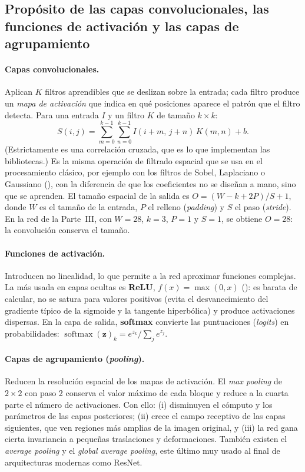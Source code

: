 \documentclass[11pt,letterpaper]{article}
\makeatletter
\newcommand{\cit@chk}[1]{\ifcsdef{citA@#1}{}{\PackageError{citas}{Cita no definida: #1}{}}}
\newcommand{\cit@item}[1]{\cit@chk{#1}\cit@sep\csuse{citA@#1}, \csuse{citY@#1}\gdef\cit@sep{; }}
\newcommand{\parencite}[1]{(\gdef\cit@sep{}\forcsvlist{\cit@item}{#1})}
\makeatother
\begin{document}
\subsection{Propósito de las capas convolucionales, las funciones de activación y las capas de agrupamiento}

\paragraph{Capas convolucionales.} Aplican $K$ filtros aprendibles que se deslizan sobre la entrada; cada filtro produce un \emph{mapa de activación} que indica en qué posiciones aparece el patrón que el filtro detecta. Para una entrada $I$ y un filtro $K$ de tamaño $k\times k$:
\begin{equation}
  S(i,j) = \sum_{m=0}^{k-1}\sum_{n=0}^{k-1} I(i+m,\,j+n)\,K(m,n) + b .
\end{equation}
(Estrictamente es una correlación cruzada, que es lo que implementan las bibliotecas.) Es la misma operación de filtrado espacial que se usa en el procesamiento clásico, por ejemplo con los filtros de Sobel, Laplaciano o Gaussiano \parencite{gonzalez2018}, con la diferencia de que los coeficientes no se diseñan a mano, sino que se aprenden. El tamaño espacial de la salida es $O = (W - k + 2P)/S + 1$, donde $W$ es el tamaño de la entrada, $P$ el relleno (\emph{padding}) y $S$ el paso (\emph{stride}). En la red de la Parte~III, con $W=28$, $k=3$, $P=1$ y $S=1$, se obtiene $O=28$: la convolución conserva el tamaño.

\paragraph{Funciones de activación.} Introducen no linealidad, lo que permite a la red aproximar funciones complejas. La más usada en capas ocultas es \textbf{ReLU}, $f(x)=\max(0,x)$ \parencite{nair2010}: es barata de calcular, no se satura para valores positivos (evita el desvanecimiento del gradiente típico de la sigmoide y la tangente hiperbólica) y produce activaciones dispersas. En la capa de salida, \textbf{softmax} convierte las puntuaciones (\emph{logits}) en probabilidades: $\operatorname{softmax}(\mathbf{z})_k = e^{z_k}/\sum_j e^{z_j}$.

\paragraph{Capas de agrupamiento (\emph{pooling}).} Reducen la resolución espacial de los mapas de activación. El \emph{max pooling} de $2\times2$ con paso 2 conserva el valor máximo de cada bloque y reduce a la cuarta parte el número de activaciones. Con ello: (i) disminuyen el cómputo y los parámetros de las capas posteriores; (ii) crece el campo receptivo de las capas siguientes, que ven regiones más amplias de la imagen original, y (iii) la red gana cierta invariancia a pequeñas traslaciones y deformaciones. También existen el \emph{average pooling} y el \emph{global average pooling}, este último muy usado al final de arquitecturas modernas como ResNet.
\end{document}
